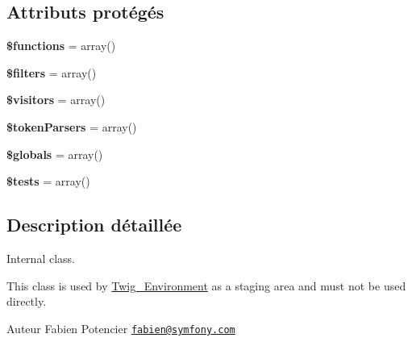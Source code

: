 \subsection*{Attributs protégés}
\begin{DoxyCompactItemize}
\item 
{\bfseries \$functions} = array()\hypertarget{class_twig___extension___staging_aa75daea491817f3b64daa2f51128bcdf}{}\label{class_twig___extension___staging_aa75daea491817f3b64daa2f51128bcdf}

\item 
{\bfseries \$filters} = array()\hypertarget{class_twig___extension___staging_ae222f32233a38635bef58d24a13c9df5}{}\label{class_twig___extension___staging_ae222f32233a38635bef58d24a13c9df5}

\item 
{\bfseries \$visitors} = array()\hypertarget{class_twig___extension___staging_a63a73490fa0428629a602fd9042a95aa}{}\label{class_twig___extension___staging_a63a73490fa0428629a602fd9042a95aa}

\item 
{\bfseries \$token\+Parsers} = array()\hypertarget{class_twig___extension___staging_ae54fee7b7fa068ce550c62e7e16eeb52}{}\label{class_twig___extension___staging_ae54fee7b7fa068ce550c62e7e16eeb52}

\item 
{\bfseries \$globals} = array()\hypertarget{class_twig___extension___staging_aab94a86ac6c11a08ea99c0662106ec1e}{}\label{class_twig___extension___staging_aab94a86ac6c11a08ea99c0662106ec1e}

\item 
{\bfseries \$tests} = array()\hypertarget{class_twig___extension___staging_a6d7f4b753e7eb18b328a7eeba5e0094f}{}\label{class_twig___extension___staging_a6d7f4b753e7eb18b328a7eeba5e0094f}

\end{DoxyCompactItemize}


\subsection{Description détaillée}
Internal class.

This class is used by \hyperlink{class_twig___environment}{Twig\+\_\+\+Environment} as a staging area and must not be used directly.

\begin{DoxyAuthor}{Auteur}
Fabien Potencier \href{mailto:fabien@symfony.com}{\tt fabien@symfony.\+com} 
\end{DoxyAuthor}


